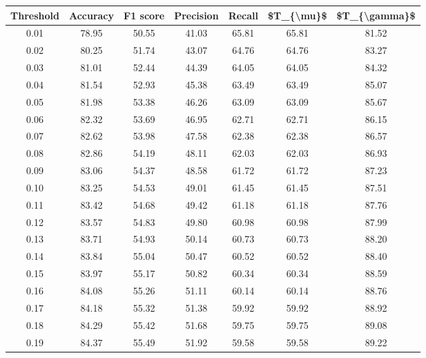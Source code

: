 \begin{tabular}{|c|c|c|c|c|c|c|}
\hline
 Threshold &  Accuracy &  F1 score &  Precision &  Recall &  \$T\_\{\textbackslash mu\}\$ &  \$T\_\{\textbackslash gamma\}\$ \\
\hline
      0.01 &     78.95 &     50.55 &      41.03 &   65.81 &      65.81 &         81.52 \\
      0.02 &     80.25 &     51.74 &      43.07 &   64.76 &      64.76 &         83.27 \\
      0.03 &     81.01 &     52.44 &      44.39 &   64.05 &      64.05 &         84.32 \\
      0.04 &     81.54 &     52.93 &      45.38 &   63.49 &      63.49 &         85.07 \\
      0.05 &     81.98 &     53.38 &      46.26 &   63.09 &      63.09 &         85.67 \\
      0.06 &     82.32 &     53.69 &      46.95 &   62.71 &      62.71 &         86.15 \\
      0.07 &     82.62 &     53.98 &      47.58 &   62.38 &      62.38 &         86.57 \\
      0.08 &     82.86 &     54.19 &      48.11 &   62.03 &      62.03 &         86.93 \\
      0.09 &     83.06 &     54.37 &      48.58 &   61.72 &      61.72 &         87.23 \\
      0.10 &     83.25 &     54.53 &      49.01 &   61.45 &      61.45 &         87.51 \\
      0.11 &     83.42 &     54.68 &      49.42 &   61.18 &      61.18 &         87.76 \\
      0.12 &     83.57 &     54.83 &      49.80 &   60.98 &      60.98 &         87.99 \\
      0.13 &     83.71 &     54.93 &      50.14 &   60.73 &      60.73 &         88.20 \\
      0.14 &     83.84 &     55.04 &      50.47 &   60.52 &      60.52 &         88.40 \\
      0.15 &     83.97 &     55.17 &      50.82 &   60.34 &      60.34 &         88.59 \\
      0.16 &     84.08 &     55.26 &      51.11 &   60.14 &      60.14 &         88.76 \\
      0.17 &     84.18 &     55.32 &      51.38 &   59.92 &      59.92 &         88.92 \\
      0.18 &     84.29 &     55.42 &      51.68 &   59.75 &      59.75 &         89.08 \\
      0.19 &     84.37 &     55.49 &      51.92 &   59.58 &      59.58 &         89.22 \\

\end{tabular}
